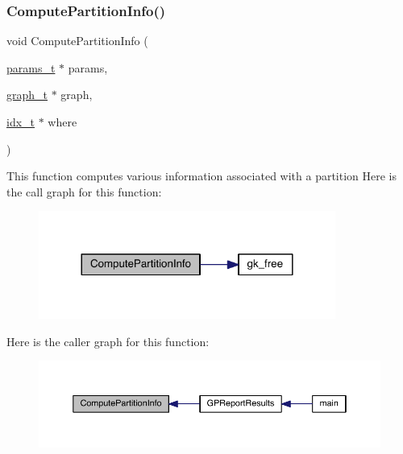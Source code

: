 \subsubsection{\texorpdfstring{Compute\+Partition\+Info()}{ComputePartitionInfo()}}
{\footnotesize\ttfamily void Compute\+Partition\+Info (\begin{DoxyParamCaption}\item[{\hyperlink{a00706}{params\+\_\+t} $\ast$}]{params,  }\item[{\hyperlink{a00734}{graph\+\_\+t} $\ast$}]{graph,  }\item[{\hyperlink{a00876_aaa5262be3e700770163401acb0150f52}{idx\+\_\+t} $\ast$}]{where }\end{DoxyParamCaption})}

This function computes various information associated with a partition Here is the call graph for this function\+:\nopagebreak
\begin{figure}[H]
\begin{center}
\leavevmode
\includegraphics[width=276pt]{a00948_a16087d53e4f04771ed2ffbd810711cba_cgraph}
\end{center}
\end{figure}
Here is the caller graph for this function\+:\nopagebreak
\begin{figure}[H]
\begin{center}
\leavevmode
\includegraphics[width=350pt]{a00948_a16087d53e4f04771ed2ffbd810711cba_icgraph}
\end{center}
\end{figure}
\mbox{\label{a00948_a621f3f8c2f9b93614ecb2fdf86a6cc53}} 

